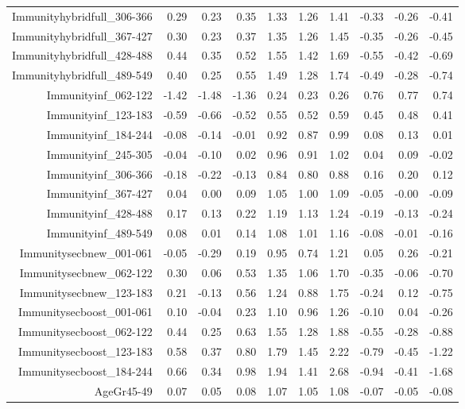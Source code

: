 \begin{table}[ht]
\begin{tabular}{rrrrrrrrrr}
  Immunityhybridfull\_306-366 & 0.29 & 0.23 & 0.35 & 1.33 & 1.26 & 1.41 & -0.33 & -0.26 & -0.41 \\ 
  Immunityhybridfull\_367-427 & 0.30 & 0.23 & 0.37 & 1.35 & 1.26 & 1.45 & -0.35 & -0.26 & -0.45 \\ 
  Immunityhybridfull\_428-488 & 0.44 & 0.35 & 0.52 & 1.55 & 1.42 & 1.69 & -0.55 & -0.42 & -0.69 \\ 
  Immunityhybridfull\_489-549 & 0.40 & 0.25 & 0.55 & 1.49 & 1.28 & 1.74 & -0.49 & -0.28 & -0.74 \\ 
  Immunityinf\_062-122 & -1.42 & -1.48 & -1.36 & 0.24 & 0.23 & 0.26 & 0.76 & 0.77 & 0.74 \\ 
  Immunityinf\_123-183 & -0.59 & -0.66 & -0.52 & 0.55 & 0.52 & 0.59 & 0.45 & 0.48 & 0.41 \\ 
  Immunityinf\_184-244 & -0.08 & -0.14 & -0.01 & 0.92 & 0.87 & 0.99 & 0.08 & 0.13 & 0.01 \\ 
  Immunityinf\_245-305 & -0.04 & -0.10 & 0.02 & 0.96 & 0.91 & 1.02 & 0.04 & 0.09 & -0.02 \\ 
  Immunityinf\_306-366 & -0.18 & -0.22 & -0.13 & 0.84 & 0.80 & 0.88 & 0.16 & 0.20 & 0.12 \\ 
  Immunityinf\_367-427 & 0.04 & 0.00 & 0.09 & 1.05 & 1.00 & 1.09 & -0.05 & -0.00 & -0.09 \\ 
  Immunityinf\_428-488 & 0.17 & 0.13 & 0.22 & 1.19 & 1.13 & 1.24 & -0.19 & -0.13 & -0.24 \\ 
  Immunityinf\_489-549 & 0.08 & 0.01 & 0.14 & 1.08 & 1.01 & 1.16 & -0.08 & -0.01 & -0.16 \\ 
  Immunitysecbnew\_001-061 & -0.05 & -0.29 & 0.19 & 0.95 & 0.74 & 1.21 & 0.05 & 0.26 & -0.21 \\ 
  Immunitysecbnew\_062-122 & 0.30 & 0.06 & 0.53 & 1.35 & 1.06 & 1.70 & -0.35 & -0.06 & -0.70 \\ 
  Immunitysecbnew\_123-183 & 0.21 & -0.13 & 0.56 & 1.24 & 0.88 & 1.75 & -0.24 & 0.12 & -0.75 \\ 
  Immunitysecboost\_001-061 & 0.10 & -0.04 & 0.23 & 1.10 & 0.96 & 1.26 & -0.10 & 0.04 & -0.26 \\ 
  Immunitysecboost\_062-122 & 0.44 & 0.25 & 0.63 & 1.55 & 1.28 & 1.88 & -0.55 & -0.28 & -0.88 \\ 
  Immunitysecboost\_123-183 & 0.58 & 0.37 & 0.80 & 1.79 & 1.45 & 2.22 & -0.79 & -0.45 & -1.22 \\ 
  Immunitysecboost\_184-244 & 0.66 & 0.34 & 0.98 & 1.94 & 1.41 & 2.68 & -0.94 & -0.41 & -1.68 \\ 
  AgeGr45-49 & 0.07 & 0.05 & 0.08 & 1.07 & 1.05 & 1.08 & -0.07 & -0.05 & -0.08 \\ 

\end{tabular}
\end{table}
